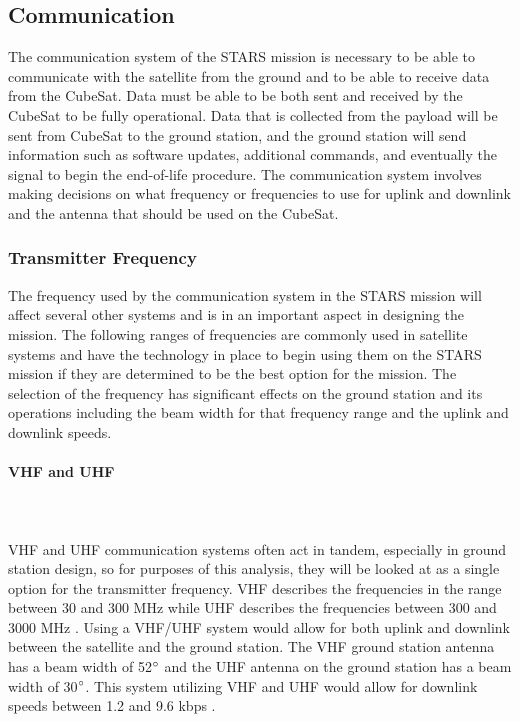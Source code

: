 
\subsection{Communication}
The communication system of the STARS mission is necessary to be able to communicate with the satellite from the ground and to be able to receive data from the CubeSat. Data must be able to be both sent and received by the CubeSat to be fully operational. Data that is collected from the payload will be sent from CubeSat to the ground station, and the ground station will send information such as software updates, additional commands, and eventually the signal to begin the end-of-life procedure. The communication system involves making decisions on what frequency or frequencies to use for uplink and downlink and the antenna that should be used on the CubeSat. 

\subsubsection{Transmitter Frequency}
The frequency used by the communication system in the STARS mission will affect several other systems and is in an important aspect in designing the mission. The following ranges of frequencies are commonly used in satellite systems and have the technology in place to begin using them on the STARS mission if they are determined to be the best option for the mission. The selection of the frequency has significant effects on the ground station and its operations including the beam width for that frequency range and the uplink and downlink speeds. 

\paragraph{VHF and UHF} ~\\~\\
VHF and UHF communication systems often act in tandem, especially in ground station design, so for purposes of this analysis, they will be looked at as a single option for the transmitter frequency. VHF describes the frequencies in the range between 30 and 300 MHz while UHF describes the frequencies between 300 and 3000 MHz \cite{ITU}. Using a VHF/UHF system would allow for both uplink and downlink between the satellite and the ground station. The VHF ground station antenna has a beam width of 52$\degree$ and the UHF antenna on the ground station has a beam width of 30$\degree$. This system utilizing VHF and UHF would allow for downlink speeds between 1.2 and 9.6 kbps \cite{isis_ground}.


